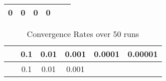 \documentclass[12pt,a4paper]{article}
\begin{document}
\begin{longtable}[c]{@{}cccccc@{}}
\begin{minipage}[t]{0.08\columnwidth}\centering\strut
0
\strut\end{minipage} &
\begin{minipage}[t]{0.09\columnwidth}\centering\strut
0
\strut\end{minipage} &
\begin{minipage}[t]{0.10\columnwidth}\centering\strut
0
\strut\end{minipage} &
\begin{minipage}[t]{0.10\columnwidth}\centering\strut
0
\strut\end{minipage}\tabularnewline
\bottomrule
\end{longtable}

\begin{longtable}[c]{@{}cccccc@{}}
\caption{Convergence Rates over 50 runs}\tabularnewline
\toprule
\begin{minipage}[b]{0.12\columnwidth}\centering\strut
~
\strut\end{minipage} &
\begin{minipage}[b]{0.08\columnwidth}\centering\strut
0.1
\strut\end{minipage} &
\begin{minipage}[b]{0.08\columnwidth}\centering\strut
0.01
\strut\end{minipage} &
\begin{minipage}[b]{0.09\columnwidth}\centering\strut
0.001
\strut\end{minipage} &
\begin{minipage}[b]{0.10\columnwidth}\centering\strut
0.0001
\strut\end{minipage} &
\begin{minipage}[b]{0.10\columnwidth}\centering\strut
0.00001
\strut\end{minipage}\tabularnewline
\midrule
\endfirsthead
\toprule
\begin{minipage}[b]{0.12\columnwidth}\centering\strut
~
\strut\end{minipage} &
\begin{minipage}[b]{0.08\columnwidth}\centering\strut
0.1
\strut\end{minipage} &
\begin{minipage}[b]{0.08\columnwidth}\centering\strut
0.01
\strut\end{minipage} &
\begin{minipage}[b]{0.09\columnwidth}\centering\strut
0.001
\strut\end{minipage} &
\begin{minipage}[b]{0.10\columnwidth}\centering\strut

\end{minipage}
\end{longtable}
\end{document}
